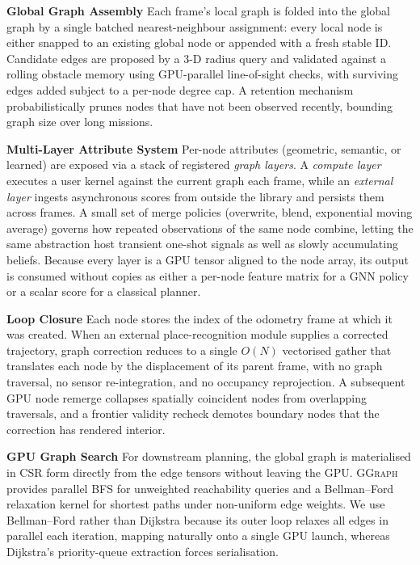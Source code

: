\documentclass{article}
\newcommand{\sysname}{\textcolor{ggcolor}{\textsc{GGraph}}\xspace}
\begin{document}
\textbf{Global Graph Assembly}
Each frame's local graph is folded into the global graph by a single
batched nearest-neighbour assignment: every local node is either
snapped to an existing global node or appended with a fresh stable
ID. Candidate edges are proposed by a 3-D radius query and validated
against a rolling obstacle memory using GPU-parallel line-of-sight
checks, with surviving edges added subject to a per-node degree cap.
A retention mechanism probabilistically prunes nodes that have not
been observed recently, bounding graph size over long missions.

\textbf{Multi-Layer Attribute System}
Per-node attributes (geometric, semantic, or learned) are exposed
via a stack of registered \emph{graph layers}. A \emph{compute layer}
executes a user kernel against the current graph each frame, while an
\emph{external layer} ingests asynchronous scores from outside the
library and persists them across frames. A small set of merge
policies (overwrite, blend, exponential moving average) governs how
repeated observations of the same node combine, letting the same
abstraction host transient one-shot signals as well as slowly
accumulating beliefs. Because every layer is a GPU tensor aligned to
the node array, its output is consumed without copies as either a
per-node feature matrix for a GNN policy or a scalar score for a
classical planner.

\textbf{Loop Closure}
Each node stores the index of the odometry frame at which it was
created. When an external place-recognition module supplies a
corrected trajectory, graph correction reduces to a single $O(N)$
vectorised gather that translates each node by the displacement of
its parent frame, with no graph traversal, no sensor re-integration,
and no occupancy reprojection. A subsequent GPU node remerge
collapses spatially coincident nodes from overlapping traversals, and
a frontier validity recheck demotes boundary nodes that the
correction has rendered interior.

\textbf{GPU Graph Search}
For downstream planning, the global graph is materialised in CSR form
directly from the edge tensors without leaving the GPU. \sysname
provides parallel BFS for unweighted reachability queries and a
Bellman--Ford relaxation kernel for shortest paths under non-uniform
edge weights. We use Bellman--Ford rather than Dijkstra because its
outer loop relaxes all edges in parallel each iteration, mapping
naturally onto a single GPU launch, whereas Dijkstra's priority-queue
extraction forces serialisation.
\end{document}
